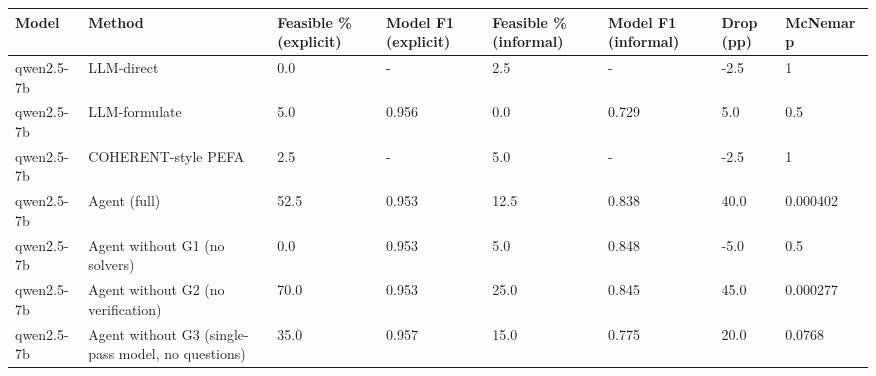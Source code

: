 \begin{tabular}{llllllll}
\toprule
Model & Method & Feasible \% (explicit) & Model F1 (explicit) & Feasible \% (informal) & Model F1 (informal) & Drop (pp) & McNemar p \\
\midrule
qwen2.5-7b & LLM-direct & 0.0 & - & 2.5 & - & -2.5 & 1 \\
qwen2.5-7b & LLM-formulate & 5.0 & 0.956 & 0.0 & 0.729 & 5.0 & 0.5 \\
qwen2.5-7b & COHERENT-style PEFA & 2.5 & - & 5.0 & - & -2.5 & 1 \\
qwen2.5-7b & Agent (full) & 52.5 & 0.953 & 12.5 & 0.838 & 40.0 & 0.000402 \\
qwen2.5-7b & Agent without G1 (no solvers) & 0.0 & 0.953 & 5.0 & 0.848 & -5.0 & 0.5 \\
qwen2.5-7b & Agent without G2 (no verification) & 70.0 & 0.953 & 25.0 & 0.845 & 45.0 & 0.000277 \\
qwen2.5-7b & Agent without G3 (single-pass model, no questions) & 35.0 & 0.957 & 15.0 & 0.775 & 20.0 & 0.0768 \\
\bottomrule
\end{tabular}
